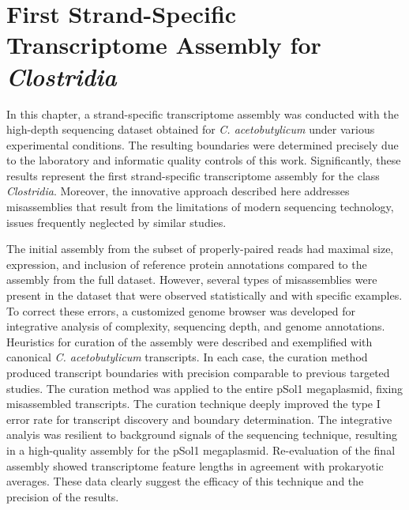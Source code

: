 


\section{First Strand-Specific Transcriptome Assembly for \itshape Clostridia}

In this chapter, a strand-specific transcriptome assembly was conducted with the high-depth sequencing dataset obtained for \textit{C. acetobutylicum} under various experimental conditions. The resulting boundaries were determined precisely due to the laboratory and informatic quality controls of this work. Significantly, these results represent the first strand-specific transcriptome assembly for the class \textit{Clostridia}. Moreover, the innovative approach described here addresses misassemblies that result from the limitations of modern sequencing technology, issues frequently neglected by similar studies.

The initial assembly from the subset of properly-paired reads had maximal size, expression, and inclusion of reference protein annotations compared to the assembly from the full dataset. However, several types of misassemblies were present in the dataset that were observed statistically and with specific examples. To correct these errors, a customized genome browser was developed for integrative analysis of complexity, sequencing depth, and genome annotations. Heuristics for curation of the assembly were described and exemplified with canonical \textit{C. acetobutylicum} transcripts. In each case, the curation method produced transcript boundaries with precision comparable to previous targeted studies. The curation method was applied to the entire pSol1 megaplasmid, fixing misassembled transcripts. The curation technique deeply improved the type I error rate for transcript discovery and boundary determination. The integrative analyis was resilient to background signals of the sequencing technique, resulting in a high-quality assembly for the pSol1 megaplasmid. Re-evaluation of the final assembly showed transcriptome feature lengths in agreement with prokaryotic averages. These data clearly suggest the efficacy of this technique and the precision of the results.
